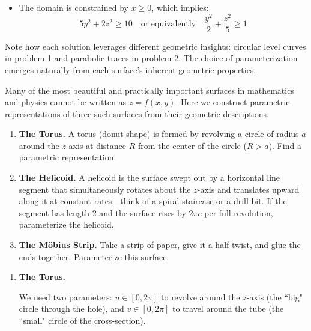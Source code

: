 \begin{example}
\begin{solution}
\begin{enumerate}
\begin{itemize}
       \item The domain is constrained by $x \geq 0$, which implies:
       \[
       5y^2 + 2z^2 \geq 10 \quad \text{or equivalently} \quad \frac{y^2}{2} + \frac{z^2}{5} \geq 1
       \]
   \end{itemize}
\end{enumerate}

\noindent Note how each solution leverages different geometric insights: circular level curves in problem 1 and parabolic traces in problem 2. The choice of parameterization emerges naturally from each surface's inherent geometric properties.

\end{solution}
\end{example}
\exampleline

\begin{example}
Many of the most beautiful and practically important surfaces in mathematics and physics cannot be written as $z = f(x,y)$. Here we construct parametric representations of three such surfaces from their geometric descriptions.

\begin{enumerate}
\item \textbf{The Torus.} A torus (donut shape) is formed by revolving a circle of radius $a$ around the $z$-axis at distance $R$ from the center of the circle ($R > a$). Find a parametric representation.

\item \textbf{The Helicoid.} A helicoid is the surface swept out by a horizontal line segment that simultaneously rotates about the $z$-axis and translates upward along it at constant rates---think of a spiral staircase or a drill bit. If the segment has length $2$ and the surface rises by $2\pi c$ per full revolution, parameterize the helicoid.

\item \textbf{The Möbius Strip.} Take a strip of paper, give it a half-twist, and glue the ends together. Parameterize this surface.
\end{enumerate}

\begin{solution}
\begin{enumerate}
\item \textbf{The Torus.}

We need two parameters: $u \in [0, 2\pi]$ to revolve around the $z$-axis (the ``big" circle through the hole), and $v \in [0, 2\pi]$ to travel around the tube (the ``small" circle of the cross-section).


\end{enumerate}
\end{solution}
\end{example}
